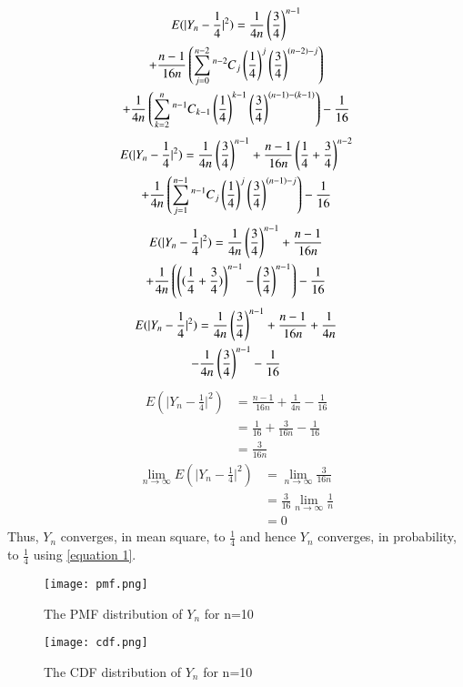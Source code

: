 \documentclass[journal,12pt,twocolumn]{IEEEtran}
\begin{document}
 \begin{multline}
     E(\lvert Y_n-\frac{1}{4}\rvert^2) = \frac{1}{4n}\brak{\frac{3}{4}}^{n-1} \\+ \frac{n-1}{16n} 
   \brak{\sum_{j=0}^{n-2}\comb[n-2]{j}\brak{\frac{1}{4}}^{j} \brak{\frac{3}{4}}^{(n-2)-j} }
   \\+\frac{1}{4n} \brak{\sum_{k=2}^{n}\comb[n-1]{k-1}\brak{\frac{1}{4}}^{k-1} \brak{\frac{3}{4}}^{(n-1)-(k-1)} } - \frac{1}{16}
\end{multline}
\begin{multline}
    E(\lvert Y_n-\frac{1}{4}\rvert^2) = \frac{1}{4n}\brak{\frac{3}{4}}^{n-1} + \frac{n-1}{16n}\brak{\frac{1}{4} + \frac{3}{4}}^{n-2}
   \\+\frac{1}{4n} \brak{\sum_{j=1}^{n-1}\comb[n-1]{j}\brak{\frac{1}{4}}^{j} \brak{\frac{3}{4}}^{(n-1)-j} }- \frac{1}{16}
\end{multline}
\begin{multline}
    E(\lvert Y_n-\frac{1}{4}\rvert^2) = \frac{1}{4n}\brak{\frac{3}{4}}^{n-1} + \frac{n-1}{16n}
   \\+\frac{1}{4n} \brak{\brak{(\frac{1}{4} + \frac{3}{4})}^{n-1} - \brak{\frac{3}{4}}^{n-1}} -\frac{1}{16}
\end{multline}
\begin{multline}
    E(\lvert Y_n-\frac{1}{4}\rvert^2) = \frac{1}{4n}\brak{\frac{3}{4}}^{n-1} + \frac{n-1}{16n} +\frac{1}{4n} \\- \frac{1}{4n}\brak{\frac{3}{4}}^{n-1}-\frac{1}{16}
\end{multline}
\begin{align}
     E(\lvert Y_n-\frac{1}{4}\rvert^2) &=  \frac{n-1}{16n} +\frac{1}{4n} -\frac{1}{16}
    \\&= \frac{1}{16} + \frac{3}{16n} - \frac{1}{16}
    \\&= \frac{3}{16n}
\end{align}
\begin{align}
    \lim_{n\rightarrow \infty} E(\lvert Y_n-\frac{1}{4}\rvert^2) &=  \lim_{n\rightarrow \infty}  \frac{3}{16n}
    \\&= \frac{3}{16}\lim_{n\rightarrow \infty}\frac{1}{n}
    \\&= 0
\end{align}
Thus, $Y_n$ converges, in mean square, to $\frac{1}{4}$ and hence $Y_n$ converges, in probability, to $\frac{1}{4}$ using \eqref{equation 1}.
 
\begin{figure} [H]
    \texttt{[image: pmf.png]}
    \caption{The PMF distribution of $Y_n$ for n=10}
    \label{Fig 1}
\end{figure}
\begin{figure} [H]
    \texttt{[image: cdf.png]}
    \caption{The CDF distribution of $Y_n$ for n=10}
    \label{Fig 2}
\end{figure}
\end{document}
